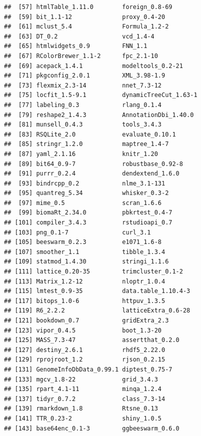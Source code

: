 \documentclass[]{book}
\theoremstyle{definition}
\theoremstyle{definition}
\theoremstyle{definition}
\theoremstyle{remark}
\begin{document}
\begin{verbatim}
##  [57] htmlTable_1.11.0        foreign_0.8-69         
##  [59] bit_1.1-12              proxy_0.4-20           
##  [61] mclust_5.4              Formula_1.2-2          
##  [63] DT_0.2                  vcd_1.4-4              
##  [65] htmlwidgets_0.9         FNN_1.1                
##  [67] RColorBrewer_1.1-2      fpc_2.1-10             
##  [69] acepack_1.4.1           modeltools_0.2-21      
##  [71] pkgconfig_2.0.1         XML_3.98-1.9           
##  [73] flexmix_2.3-14          nnet_7.3-12            
##  [75] locfit_1.5-9.1          dynamicTreeCut_1.63-1  
##  [77] labeling_0.3            rlang_0.1.4            
##  [79] reshape2_1.4.3          AnnotationDbi_1.40.0   
##  [81] munsell_0.4.3           tools_3.4.3            
##  [83] RSQLite_2.0             evaluate_0.10.1        
##  [85] stringr_1.2.0           maptree_1.4-7          
##  [87] yaml_2.1.16             knitr_1.20             
##  [89] bit64_0.9-7             robustbase_0.92-8      
##  [91] purrr_0.2.4             dendextend_1.6.0       
##  [93] bindrcpp_0.2            nlme_3.1-131           
##  [95] quantreg_5.34           whisker_0.3-2          
##  [97] mime_0.5                scran_1.6.6            
##  [99] biomaRt_2.34.0          pbkrtest_0.4-7         
## [101] compiler_3.4.3          rstudioapi_0.7         
## [103] png_0.1-7               curl_3.1               
## [105] beeswarm_0.2.3          e1071_1.6-8            
## [107] smoother_1.1            tibble_1.3.4           
## [109] statmod_1.4.30          stringi_1.1.6          
## [111] lattice_0.20-35         trimcluster_0.1-2      
## [113] Matrix_1.2-12           nloptr_1.0.4           
## [115] lmtest_0.9-35           data.table_1.10.4-3    
## [117] bitops_1.0-6            httpuv_1.3.5           
## [119] R6_2.2.2                latticeExtra_0.6-28    
## [121] bookdown_0.7            gridExtra_2.3          
## [123] vipor_0.4.5             boot_1.3-20            
## [125] MASS_7.3-47             assertthat_0.2.0       
## [127] destiny_2.6.1           rhdf5_2.22.0           
## [129] rprojroot_1.2           rjson_0.2.15           
## [131] GenomeInfoDbData_0.99.1 diptest_0.75-7         
## [133] mgcv_1.8-22             grid_3.4.3             
## [135] rpart_4.1-11            minqa_1.2.4            
## [137] tidyr_0.7.2             class_7.3-14           
## [139] rmarkdown_1.8           Rtsne_0.13             
## [141] TTR_0.23-2              shiny_1.0.5            
## [143] base64enc_0.1-3         ggbeeswarm_0.6.0
\end{verbatim}


\end{document}
